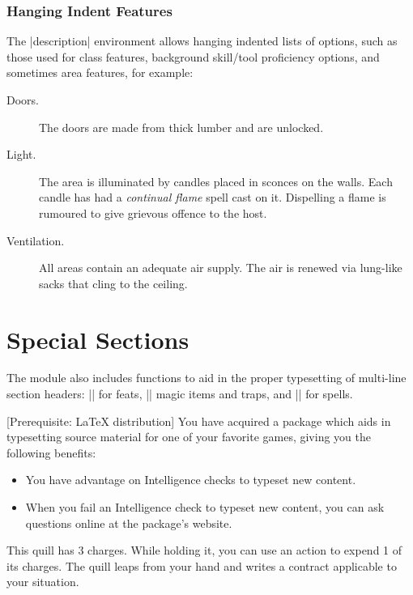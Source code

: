 \documentclass[letterpaper,twocolumn,openany,nodeprecatedcode]{dndbook}
\begin{document}
\subsubsection{Hanging Indent Features}
The |{description}| environment allows hanging indented
lists of options, such as those used for class features,
background skill/tool proficiency options, and
sometimes area features, for example:

\begin{description}
  \item[Doors.]
  The doors are made from thick lumber and are unlocked.

  \item[Light.]
  The area is illuminated by candles placed in sconces on the
  walls. Each candle has had a \textit{continual flame} spell
  cast on it. Dispelling a flame is rumoured to give grievous offence
  to the host.

  \item[Ventilation.]
  All areas contain an adequate air supply. The air is renewed
  via lung-like sacks that cling to the ceiling.
\end{description}

\section{Special Sections}
The module also includes functions to aid in the proper typesetting of multi-line section headers: |\DndFeatHeader| for feats, |\DndItemHeader| magic items and traps, and |\DndSpellHeader| for spells.

[Prerequisite: \LaTeX{} distribution]
You have acquired a package which aids in typesetting source material for one of your favorite games, giving you the following benefits:

\begin{itemize}
  \item You have advantage on Intelligence checks to typeset new content.
  \item When you fail an Intelligence check to typeset new content, you can ask questions online at the package's website.
\end{itemize}

This quill has 3 charges. While holding it, you can use an action to expend 1 of its charges. The quill leaps from your hand and writes a contract applicable to your situation.
\end{document}
